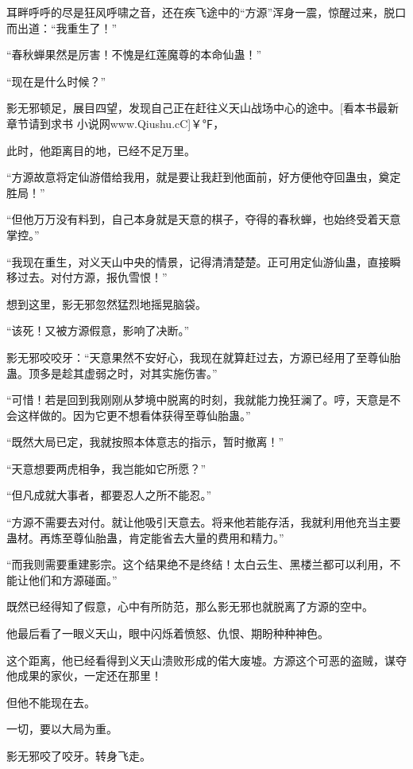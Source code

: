 
\begin{this_body}

耳畔呼呼的尽是狂风呼啸之音，还在疾飞途中的“方源”浑身一震，惊醒过来，脱口而出道：“我重生了！”

“春秋蝉果然是厉害！不愧是红莲魔尊的本命仙蛊！”

“现在是什么时候？”

影无邪顿足，展目四望，发现自己正在赶往义天山战场中心的途中。[看本书最新章节请到求书 小说网www.Qiushu.cC]￥℉，

此时，他距离目的地，已经不足万里。

“方源故意将定仙游借给我用，就是要让我赶到他面前，好方便他夺回蛊虫，奠定胜局！”

“但他万万没有料到，自己本身就是天意的棋子，夺得的春秋蝉，也始终受着天意掌控。”

“我现在重生，对义天山中央的情景，记得清清楚楚。正可用定仙游仙蛊，直接瞬移过去。对付方源，报仇雪恨！”

想到这里，影无邪忽然猛烈地摇晃脑袋。

“该死！又被方源假意，影响了决断。”

影无邪咬咬牙：“天意果然不安好心，我现在就算赶过去，方源已经用了至尊仙胎蛊。顶多是趁其虚弱之时，对其实施伤害。”

“可惜！若是回到我刚刚从梦境中脱离的时刻，我就能力挽狂澜了。哼，天意是不会这样做的。因为它更不想看体获得至尊仙胎蛊。”

“既然大局已定，我就按照本体意志的指示，暂时撤离！”

“天意想要两虎相争，我岂能如它所愿？”

“但凡成就大事者，都要忍人之所不能忍。”

“方源不需要去对付。就让他吸引天意去。将来他若能存活，我就利用他充当主要蛊材。再炼至尊仙胎蛊，肯定能省去大量的费用和精力。”

“而我则需要重建影宗。这个结果绝不是终结！太白云生、黑楼兰都可以利用，不能让他们和方源碰面。”

既然已经得知了假意，心中有所防范，那么影无邪也就脱离了方源的空中。

他最后看了一眼义天山，眼中闪烁着愤怒、仇恨、期盼种种神色。

这个距离，他已经看得到义天山溃败形成的偌大废墟。方源这个可恶的盗贼，谋夺他成果的家伙，一定还在那里！

但他不能现在去。

一切，要以大局为重。

影无邪咬了咬牙。转身飞走。


\end{this_body}
